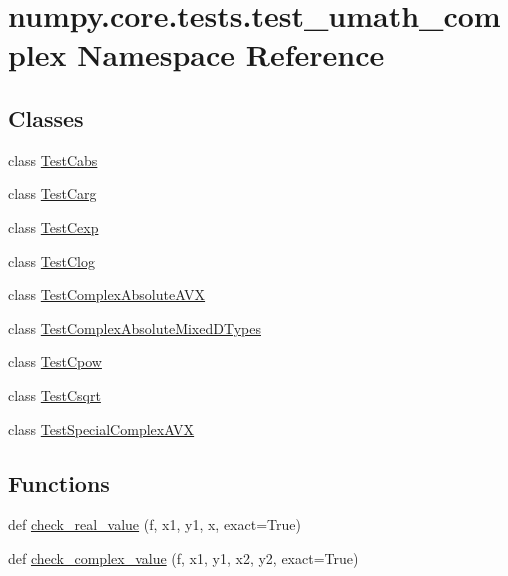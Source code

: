 \hypertarget{namespacenumpy_1_1core_1_1tests_1_1test__umath__complex}{}\section{numpy.\+core.\+tests.\+test\+\_\+umath\+\_\+complex Namespace Reference}
\label{namespacenumpy_1_1core_1_1tests_1_1test__umath__complex}
\subsection*{Classes}
\begin{DoxyCompactItemize}
\item 
class \hyperlink{classnumpy_1_1core_1_1tests_1_1test__umath__complex_1_1TestCabs}{Test\+Cabs}
\item 
class \hyperlink{classnumpy_1_1core_1_1tests_1_1test__umath__complex_1_1TestCarg}{Test\+Carg}
\item 
class \hyperlink{classnumpy_1_1core_1_1tests_1_1test__umath__complex_1_1TestCexp}{Test\+Cexp}
\item 
class \hyperlink{classnumpy_1_1core_1_1tests_1_1test__umath__complex_1_1TestClog}{Test\+Clog}
\item 
class \hyperlink{classnumpy_1_1core_1_1tests_1_1test__umath__complex_1_1TestComplexAbsoluteAVX}{Test\+Complex\+Absolute\+A\+VX}
\item 
class \hyperlink{classnumpy_1_1core_1_1tests_1_1test__umath__complex_1_1TestComplexAbsoluteMixedDTypes}{Test\+Complex\+Absolute\+Mixed\+D\+Types}
\item 
class \hyperlink{classnumpy_1_1core_1_1tests_1_1test__umath__complex_1_1TestCpow}{Test\+Cpow}
\item 
class \hyperlink{classnumpy_1_1core_1_1tests_1_1test__umath__complex_1_1TestCsqrt}{Test\+Csqrt}
\item 
class \hyperlink{classnumpy_1_1core_1_1tests_1_1test__umath__complex_1_1TestSpecialComplexAVX}{Test\+Special\+Complex\+A\+VX}
\end{DoxyCompactItemize}
\subsection*{Functions}
\begin{DoxyCompactItemize}
\item 
def \hyperlink{namespacenumpy_1_1core_1_1tests_1_1test__umath__complex_ae07ea5342963c81c8a7904aac2d26c31}{check\+\_\+real\+\_\+value} (f, x1, y1, x, exact=True)
\item 
def \hyperlink{namespacenumpy_1_1core_1_1tests_1_1test__umath__complex_a7d7711cca42ae62691c2526497d66c52}{check\+\_\+complex\+\_\+value} (f, x1, y1, x2, y2, exact=True)
\end{DoxyCompactItemize}
